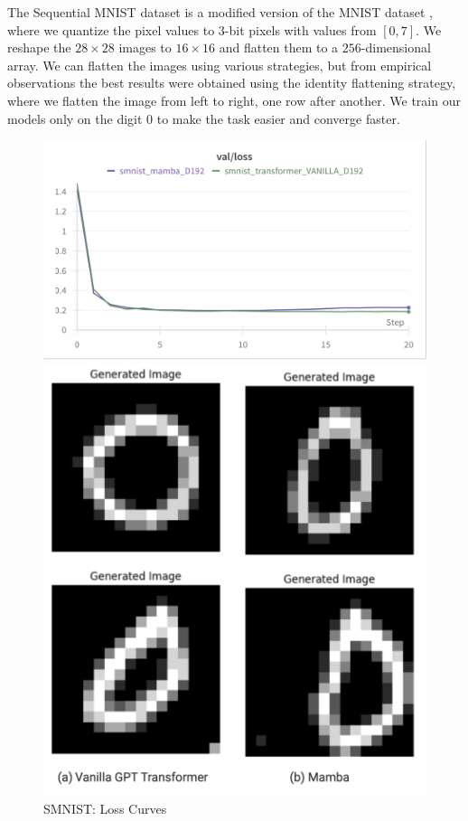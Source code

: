 \documentclass[12pt,a4paper]{report}
\begin{document}
The Sequential MNIST dataset is a modified version of the MNIST dataset \cite{mnist}, where we quantize the pixel values to $3$-bit pixels with values from $[0, 7]$. We reshape the $28 \times 28$ images to $16 \times 16$ and flatten them to a $256$-dimensional array. We can flatten the images using various strategies, but from empirical observations the best results were obtained using the identity flattening strategy, where we flatten the image from left to right, one row after another. We train our models only on the digit $0$ to make the task easier and converge faster.

\begin{figure}[ht]
    \centering
    \begin{minipage}[b]{0.45\textwidth}
        \centering
        \includegraphics[scale=0.4]{experiments/smnist/smnist_final_loss.png}
        \caption{SMNIST: Loss Curves}
        \label{smnist-loss}
    \end{minipage}
    \hspace{0.05\textwidth}
    \begin{minipage}[b]{0.45\textwidth}
        \centering
        \includegraphics[scale=0.3]{experiments/smnist/smnist_gen.png}

\end{minipage}
\end{figure}
\end{document}
